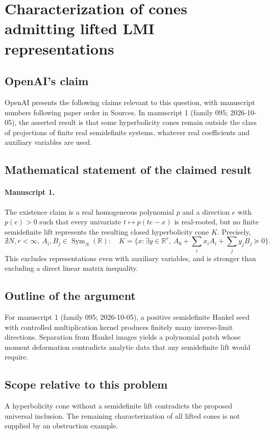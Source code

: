 \documentclass[11pt]{article}
\begin{document}
\section*{Characterization of cones admitting lifted LMI representations}

\subsection{OpenAI's claim}
OpenAI presents the following claims relevant to this question, with manuscript numbers following paper order in Sources. In manuscript 1 (family 095; 2026-10-05), the asserted result is that some hyperbolicity cones remain outside the class of projections of finite real semidefinite systems, whatever real coefficients and auxiliary variables are used.

\subsection{Mathematical statement of the claimed result}
\paragraph{Manuscript 1.}
The existence claim is a real homogeneous polynomial $p$ and a direction $e$ with $p(e)>0$ such that every univariate $t\mapsto p(te-x)$ is real-rooted, but no finite semidefinite lift represents the resulting closed hyperbolicity cone $K$. Precisely,
\[
 \nexists N,r<\infty,\ A_i,B_j\in\operatorname{Sym}_N(\mathbb R):\quad
 K=\{x:\exists y\in\mathbb R^r,\ A_0+\sum_ix_iA_i+\sum_jy_jB_j\succeq0\}.
\]
This excludes representations even with auxiliary variables, and is stronger than excluding a direct linear matrix inequality.

\subsection{Outline of the argument}
For manuscript 1 (family 095; 2026-10-05), a positive semidefinite Hankel seed with controlled multiplication kernel produces finitely many inverse-limit directions. Separation from Hankel images yields a polynomial patch whose moment deformation contradicts analytic data that any semidefinite lift would require.

\subsection{Scope relative to this problem}
A hyperbolicity cone without a semidefinite lift contradicts the proposed universal inclusion. The remaining characterization of all lifted cones is not supplied by an obstruction example.
\end{document}

